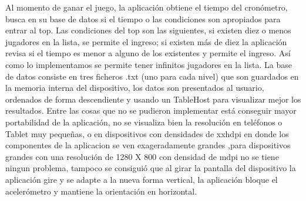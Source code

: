 \documentclass[11pt]{article} %
\begin{document}
Al momento de ganar el juego, la aplicación obtiene el tiempo del cronómetro, busca en su base de datos si el tiempo o las condiciones son apropiados para entrar al top. Las condiciones del top son las siguientes, si existen diez o menos jugadores en la lista, se permite el ingreso; si existen más de diez la aplicación revisa si el tiempo es menor a alguno de los existentes y permite el ingreso.  Así como lo implementamos se permite tener infinitos jugadores en la lista.
La base de datos consiste en tres  ficheros .txt (uno para cada nivel) que son guardados en la memoria interna del dispositivo, los datos son presentados al usuario, ordenados de forma descendiente y usando un TableHost para visualizar mejor los resultados.
Entre las cosas que no se pudieron implementar está conseguir mayor portabilidad de la aplicación, no se visualiza bien la resolución en teléfonos o Tablet muy pequeñas, o en dispositivos con densidades de xxhdpi en donde los componentes de la aplicacion se ven exageradamente grandes ,para dispositivos grandes con una resolución de 1280 X 800 con densidad de mdpi no se tiene ningun problema, tampoco se consiguió que al girar la pantalla del dispositivo la aplicación gire y se adapte a la nueva forma vertical, la aplicación bloque el acelerómetro y mantiene la orientación en horizontal. 
\end{document}
